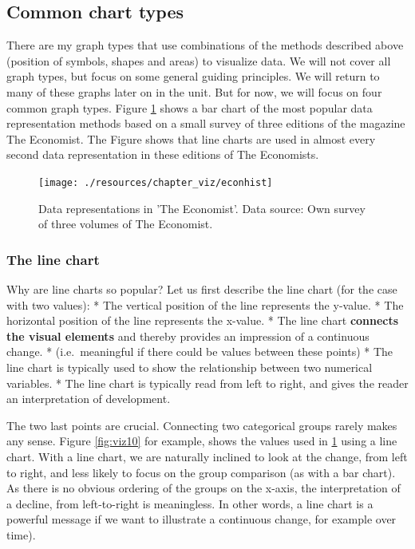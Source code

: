 \documentclass[
]{book}
\begin{document}
\hypertarget{common-chart-types}{%
\subsection*{Common chart types}\label{common-chart-types}}

There are my graph types that use combinations of the methods described above (position of symbols, shapes and areas) to visualize data. We will not cover all graph types, but focus on some general guiding principles. We will return to many of these graphs later on in the unit. But for now, we will focus on four common graph types. Figure \ref{fig:viz9} shows a bar chart of the most popular data representation methods based on a small survey of three editions of the magazine The Economist. The Figure shows that line charts are used in almost every second data representation in these editions of The Economists.

\begin{figure}

{\centering \texttt{[image: ./resources/chapter\_viz/econhist]} 

}

\caption{Data representations in 'The Economist'. Data source: Own survey  of three volumes of The Economist.}\label{fig:viz9}
\end{figure}

\hypertarget{the-line-chart}{%
\subsubsection*{The line chart}\label{the-line-chart}}

Why are line charts so popular? Let us first describe the line chart (for the case with two values):
* The vertical position of the line represents the y-value.
* The horizontal position of the line represents the x-value.
* The line chart \textbf{connects the visual elements} and thereby provides an impression of a continuous change.
* (i.e.~meaningful if there could be values between these points)
* The line chart is typically used to show the relationship between two numerical variables.
* The line chart is typically read from left to right, and gives the reader an interpretation of development.

The two last points are crucial. Connecting two categorical groups rarely makes any sense. Figure \ref{fig:viz10} for example, shows the values used in \ref{fig:viz9} using a line chart. With a line chart, we are naturally inclined to look at the change, from left to right, and less likely to focus on the group comparison (as with a bar chart). As there is no obvious ordering of the groups on the x-axis, the interpretation of a decline, from left-to-right is meaningless. In other words, a line chart is a powerful message if we want to illustrate a continuous change, for example over time).
\end{document}
